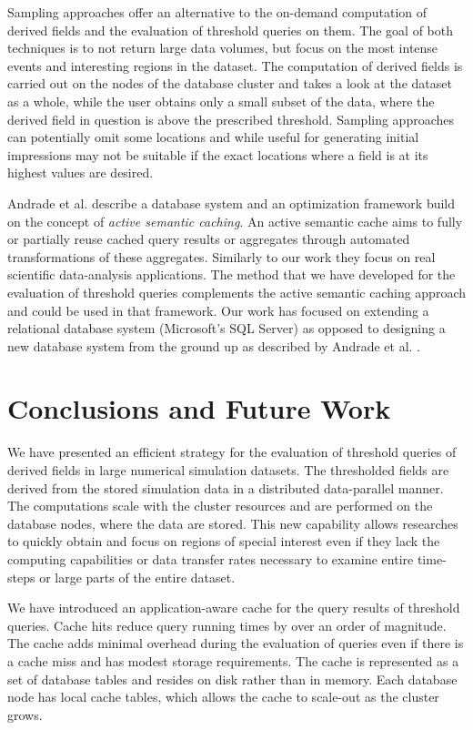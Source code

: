 \documentclass{sig-alternate}
\begin{document}
Sampling approaches \cite{Sidirourgos, Nirkhiwale} offer an alternative to the on-demand computation of derived fields and the evaluation of threshold queries
on them. The goal of both techniques is to not return large data volumes, but focus on the most intense events and interesting regions in the dataset. 
The computation of derived fields is carried out on the nodes of the database cluster and takes a look at the dataset as a whole, while the user obtains only
a small subset of the data, where the derived field in question is above the prescribed threshold. Sampling approaches can potentially omit some locations and
while useful for generating initial impressions may not be suitable if the exact locations where a field is at its highest values are desired.

Andrade et al. \cite{Andrade} describe a database system and an optimization framework build on the concept of \emph{active semantic caching}. An
active semantic cache aims to fully or partially reuse cached query results or aggregates through automated transformations of these aggregates. Similarly
to our work they focus on real scientific data-analysis applications. The method that we have developed for the evaluation of threshold queries complements
the active semantic caching approach and could be used in that framework. Our work has focused on extending a relational database system (Microsoft's SQL
Server) as opposed to designing a new database system from the ground up as described by Andrade et al. \cite{Andrade}.

\section{Conclusions and Future Work}

We have presented an efficient strategy for the evaluation of threshold queries of derived fields in large numerical simulation datasets. 
The thresholded fields are derived from the stored simulation data in a distributed data-parallel manner. The computations
scale with the cluster resources and are performed on the database nodes, where the data are stored. This new capability allows researches to quickly
obtain and focus on regions of special interest even if they lack the computing capabilities or data transfer rates necessary to examine entire time-steps
or large parts of the entire dataset. 

We have introduced an application-aware cache for the query results of threshold queries. Cache hits reduce query running times by over an order of
magnitude. The cache adds minimal overhead during the evaluation of queries even if there is
a cache miss and has modest storage requirements. The cache is represented as a set of database tables and resides on disk rather than in memory. 
Each database node has local cache tables, which allows the cache to scale-out as the cluster grows.
\end{document}
